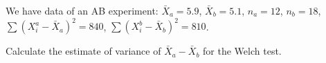 
\begin{question}
We have data of an AB experiment: \(\bar X_a = 5.9\), \(\bar X_b = 5.1\),
\(n_a = 12\), \(n_b = 18\), \(\sum (X_i^a - \bar X_a)^2 = 840\),
\(\sum (X_i^b - \bar X_b)^2 = 810\).

Calculate the estimate of variance of \(\bar X_a - \bar X_b\) for the Welch test.


\end{question}


